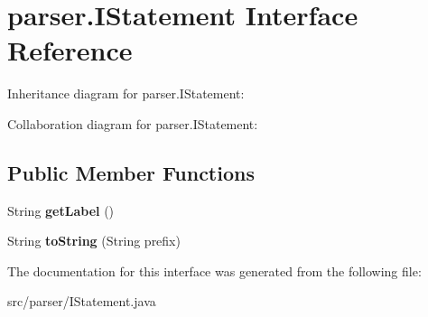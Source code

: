 \hypertarget{interfaceparser_1_1_i_statement}{}\section{parser.\+I\+Statement Interface Reference}
\label{interfaceparser_1_1_i_statement}


Inheritance diagram for parser.\+I\+Statement\+:


Collaboration diagram for parser.\+I\+Statement\+:
\subsection*{Public Member Functions}
\begin{DoxyCompactItemize}
\item 
String {\bfseries get\+Label} ()\hypertarget{interfaceparser_1_1_i_statement_a44f3b74e8db11248e4b59a6c9c8c6beb}{}\label{interfaceparser_1_1_i_statement_a44f3b74e8db11248e4b59a6c9c8c6beb}

\item 
String {\bfseries to\+String} (String prefix)\hypertarget{interfaceparser_1_1_i_statement_a9b5cc6729839f5fa38c7f7c20c594dc9}{}\label{interfaceparser_1_1_i_statement_a9b5cc6729839f5fa38c7f7c20c594dc9}

\end{DoxyCompactItemize}


The documentation for this interface was generated from the following file\+:\begin{DoxyCompactItemize}
\item 
src/parser/I\+Statement.\+java\end{DoxyCompactItemize}
